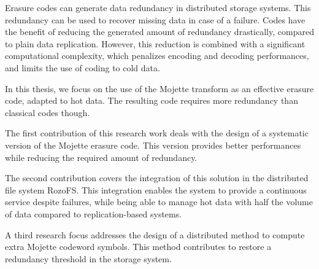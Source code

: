 Erasure codes can generate data redundancy in distributed storage systems.
This redundancy can be used to recover missing data in case of a failure. Codes
have the benefit of reducing the generated amount of redundancy drastically,
compared to plain data replication. However, this reduction is combined with a
significant computational complexity, which penalizes encoding and decoding
performances, and limits the use of coding to cold data.

In this thesis, we focus on the use of the Mojette transform as an effective
erasure code, adapted to hot data. The resulting code requires more redundancy
than classical codes though.

The first contribution of this research work deals with the design of a
systematic version of the Mojette erasure code. This version provides better
performances while reducing the required amount of redundancy.

The second contribution covers the integration of this solution in the
distributed file system RozoFS. This integration enables the system to provide
a continuous service despite failures, while being able to manage hot data with
half the volume of data compared to replication-based systems.

A third research focus addresses the design of a distributed method to compute
extra Mojette codeword symbols. This method contributes to restore a redundancy
threshold in the storage system.
